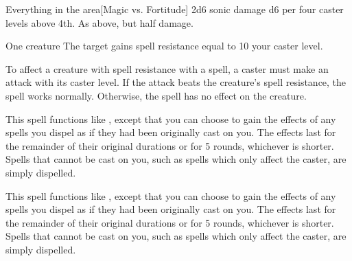 \begin{spellheader}
\end{spellheader}
\begin{spelleffects}
    \begin{spelltarget}{Everything in the area}[Magic vs. Fortitude]
        \spellsuccess 2d6 sonic damage \add d6 per four caster levels above 4th.
        \spellfailure As above, but half damage.
    \end{spelltarget}
\end{spelleffects}

\begin{spellheader}
    \spellrng{\rngclose}
    \spelldur{\durshort}
\end{spellheader}
\begin{spelleffects}
    \begin{spelltarget}{One creature}
        \spelleffect The target gains spell resistance equal to 10 \add your caster level.
    \end{spelltarget}
\end{spelleffects}
\begin{spellfooter}
    \spellnotes To affect a creature with spell resistance with a spell, a caster must make an attack with its caster level. If the attack beats the creature's spell resistance, the spell works normally. Otherwise, the spell has no effect on the creature.
\end{spellfooter}

\begin{spellheader}
\end{spellheader}
\begin{spelleffects}
    \spellspecial This spell functions like , except that you can choose to gain the effects of any spells you dispel as if they had been originally cast on you. The effects last for the remainder of their original durations or for 5 rounds, whichever is shorter. Spells that cannot be cast on you, such as spells which only affect the caster, are simply dispelled.
\end{spelleffects}

\begin{spellheader}
\end{spellheader}
\begin{spelleffects}
    \spellspecial This spell functions like , except that you can choose to gain the effects of any spells you dispel as if they had been originally cast on you. The effects last for the remainder of their original durations or for 5 rounds, whichever is shorter. Spells that cannot be cast on you, such as spells which only affect the caster, are simply dispelled.
\end{spelleffects}

